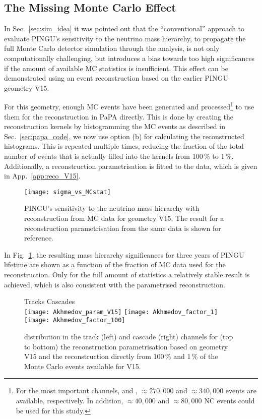 \subsection{The Missing Monte Carlo Effect}
\label{sec:results_mcstats}

In Sec.~\ref{sec:sim_idea} it was pointed out that the ``conventional''
approach to evaluate PINGU's sensitivity to the neutrino mass hierarchy, \ie to
propagate the full Monte Carlo detector simulation through the analysis, is not
only computationally challenging, but introduces a bias towards too high
significances if the amount of available MC statistics is insufficient. This
effect can be demonstrated using an event reconstruction based on the earlier
PINGU geometry V15.

For this geometry, enough MC events have been generated and
processed\footnote{For the most important channels, \nue and \numu,
$\approx 270,000$ and $\approx 340,000$ events are available, respectively. In
addition, $\approx 40,000$ \nutau and $\approx 80,000$ \nux NC events could be
used for this study.} to use them for the reconstruction in PaPA directly. This
is done by creating the reconstruction kernels by histogramming the MC events
as described in Sec.~\ref{sec:papa_code}, \ie we now use option (b) for
calculating the reconstructed histograms. This is repeated multiple times, 
reducing the fraction of the total number of events that is actually filled into
the kernels from 100\,\% to 1\,\%. Additionally, a reconstruction
parametrisation is fitted to the data, which is given in
App.~\ref{app:reco_V15}.

\begin{figure}[thp]
 \centering
 \texttt{[image: sigma\_vs\_MCstat]}
 \caption{PINGU's sensitivity to the neutrino mass hierarchy with
  reconstruction from MC data for geometry V15. The result for a reconstruction
  parametrisation from the same data is shown for reference.}
 \label{fig:sigma_vs_MCstat}
\end{figure}

In Fig.~\ref{fig:sigma_vs_MCstat}, the resulting mass hierarchy significances
for three years of PINGU lifetime are shown as a function of the fraction of MC
data used for the reconstruction. Only for the full amount of statistics a
relatively stable result is achieved, which is also consistent with the
parametrised reconstruction.

\begin{figure}[p]
 \centering
   Tracks \hspace{5cm} Cascades\\
   \texttt{[image: Akhmedov\_param\_V15]}
   \texttt{[image: Akhmedov\_factor\_1]} 
   \texttt{[image: Akhmedov\_factor\_100]}
 \caption{\delchi distribution in the track (left) and cascade (right) channels
   for (top to bottom) the reconstruction parametrisation based on geometry V15
   and the reconstruction directly from 100\,\% and 1\,\% of the Monte Carlo
   events available for V15.}
 \label{fig:akhmedov_MCstats}
\end{figure}

